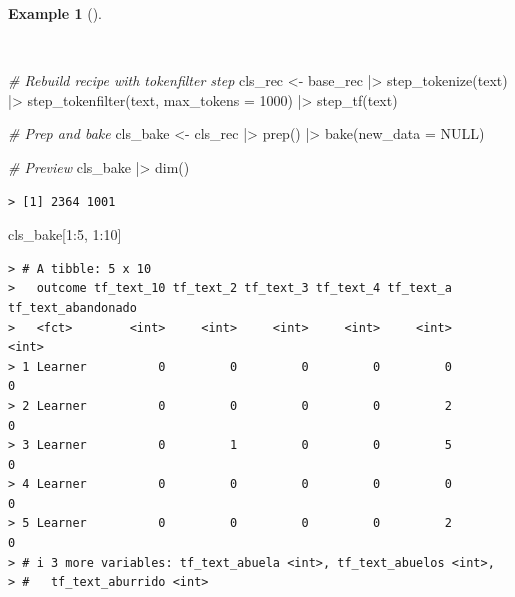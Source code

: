 \documentclass[
  letterpaper,
  DIV=11,
  numbers=noendperiod]{scrreprt}
\newenvironment{Shaded}{\begin{snugshade}}{\end{snugshade}}
\newcommand{\AttributeTok}[1]{\textcolor[rgb]{0.00,0.00,0.00}{#1}}
\newcommand{\CommentTok}[1]{\textcolor[rgb]{0.00,0.00,0.00}{\textit{#1}}}
\newcommand{\ConstantTok}[1]{\textcolor[rgb]{0.00,0.00,0.00}{#1}}
\newcommand{\DecValTok}[1]{\textcolor[rgb]{0.00,0.00,0.00}{#1}}
\newcommand{\FunctionTok}[1]{\textcolor[rgb]{0.00,0.00,0.00}{#1}}
\newcommand{\NormalTok}[1]{\textcolor[rgb]{0.00,0.00,0.00}{#1}}
\newcommand{\OtherTok}[1]{\textcolor[rgb]{0.00,0.00,0.00}{#1}}
\newcommand{\SpecialCharTok}[1]{\textcolor[rgb]{0.00,0.00,0.00}{#1}}
\theoremstyle{definition}
\newtheorem{example}{Example}[chapter]
\theoremstyle{remark}
\begin{document}
\begin{example}[]\protect\hypertarget{exm-pda-class-recipe-tokenfilter}{}\label{exm-pda-class-recipe-tokenfilter}

~

\begin{Shaded}
\begin{Highlighting}[]
\CommentTok{\# Rebuild recipe with tokenfilter step}
\NormalTok{cls\_rec }\OtherTok{\textless{}{-}}
\NormalTok{  base\_rec }\SpecialCharTok{|\textgreater{}}
  \FunctionTok{step\_tokenize}\NormalTok{(text) }\SpecialCharTok{|\textgreater{}}
  \FunctionTok{step\_tokenfilter}\NormalTok{(text, }\AttributeTok{max\_tokens =} \DecValTok{1000}\NormalTok{) }\SpecialCharTok{|\textgreater{}}
  \FunctionTok{step\_tf}\NormalTok{(text)}

\CommentTok{\# Prep and bake}
\NormalTok{cls\_bake }\OtherTok{\textless{}{-}}
\NormalTok{  cls\_rec }\SpecialCharTok{|\textgreater{}}
  \FunctionTok{prep}\NormalTok{() }\SpecialCharTok{|\textgreater{}}
  \FunctionTok{bake}\NormalTok{(}\AttributeTok{new\_data =} \ConstantTok{NULL}\NormalTok{)}

\CommentTok{\# Preview}
\NormalTok{cls\_bake }\SpecialCharTok{|\textgreater{}} \FunctionTok{dim}\NormalTok{()}
\end{Highlighting}
\end{Shaded}

\begin{verbatim}
> [1] 2364 1001
\end{verbatim}

\begin{Shaded}
\begin{Highlighting}[]
\NormalTok{cls\_bake[}\DecValTok{1}\SpecialCharTok{:}\DecValTok{5}\NormalTok{, }\DecValTok{1}\SpecialCharTok{:}\DecValTok{10}\NormalTok{]}
\end{Highlighting}
\end{Shaded}

\begin{verbatim}
> # A tibble: 5 x 10
>   outcome tf_text_10 tf_text_2 tf_text_3 tf_text_4 tf_text_a tf_text_abandonado
>   <fct>        <int>     <int>     <int>     <int>     <int>              <int>
> 1 Learner          0         0         0         0         0                  0
> 2 Learner          0         0         0         0         2                  0
> 3 Learner          0         1         0         0         5                  0
> 4 Learner          0         0         0         0         0                  0
> 5 Learner          0         0         0         0         2                  0
> # i 3 more variables: tf_text_abuela <int>, tf_text_abuelos <int>,
> #   tf_text_aburrido <int>
\end{verbatim}

\end{example}
\end{document}
